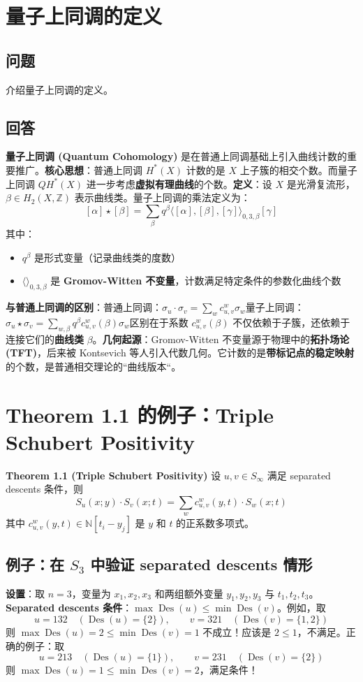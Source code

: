 \section{量子上同调的定义}\label{sec:QuantumCohomology}
\subsection{问题}
介绍量子上同调的定义。
\subsection{回答}
\textbf{量子上同调 (Quantum Cohomology)} 是在普通上同调基础上引入曲线计数的重要推广。\textbf{核心思想}：普通上同调 $H^*(X)$ 计数的是 $X$ 上子簇的相交个数。而量子上同调 $QH^*(X)$ 进一步考虑\textbf{虚拟有理曲线}的个数。\textbf{定义}：设 $X$ 是光滑复流形，$\beta \in H_2(X, \mathbb{Z})$ 表示曲线类。量子上同调的乘法定义为：$$[\alpha] \star [\beta] = \sum_{\beta} q^{\beta} \langle [\alpha], [\beta], [\gamma] \rangle_{0,3,\beta} [\gamma]$$其中：
\begin{itemize}
\item $q^{\beta}$ 是形式变量（记录曲线类的度数）
\item $\langle \rangle_{0,3,\beta}$ 是 \textbf{Gromov-Witten 不变量}，计数满足特定条件的参数化曲线个数
\end{itemize}

\textbf{与普通上同调的区别}：普通上同调：$\sigma_u \cdot \sigma_v = \sum_w c^w_{u,v} \sigma_w$量子上同调：$\sigma_u \star \sigma_v = \sum_{w,\beta} q^{\beta} c^w_{u,v}(\beta) \sigma_w$区别在于系数 $c^w_{u,v}(\beta)$ 不仅依赖于子簇，还依赖于连接它们的\textbf{曲线类} $\beta$。\textbf{几何起源}：Gromov-Witten 不变量源于物理中的\textbf{拓扑场论 (TFT)}，后来被 Kontsevich 等人引入代数几何。它计数的是\textbf{带标记点的稳定映射}的个数，是普通相交理论的``曲线版本``。
\section{Theorem 1.1 的例子：Triple Schubert Positivity}\label{app:Theorem11Examples}\textbf{Theorem 1.1 (Triple Schubert Positivity)} 设 $u, v \in S_\infty$ 满足 separated descents 条件，则$$S_u(x; y) \cdot S_v(x; t) = \sum_w c^w_{u,v}(y, t) \cdot S_w(x; t)$$其中 $c^w_{u,v}(y, t) \in \mathbb{N}[t_i - y_j]$ 是 $y$ 和 $t$ 的正系数多项式。
\subsection{例子：在 $S_3$ 中验证 separated descents 情形}\textbf{设置}：取 $n = 3$，变量为 $x_1, x_2, x_3$ 和两组额外变量 $y_1, y_2, y_3$ 与 $t_1, t_2, t_3$。\textbf{Separated descents 条件}：$\max \operatorname{Des}(u) \leq \min \operatorname{Des}(v)$。例如，取$$u = 132 \quad (\operatorname{Des}(u) = \{2\}), \qquad v = 321 \quad (\operatorname{Des}(v) = \{1, 2\})$$则 $\max \operatorname{Des}(u) = 2 \leq \min \operatorname{Des}(v) = 1$ 不成立！应该是 $2 \leq 1$，不满足。正确的例子：取$$u = 213 \quad (\operatorname{Des}(u) = \{1\}), \qquad v = 231 \quad (\operatorname{Des}(v) = \{2\})$$则 $\max \operatorname{Des}(u) = 1 \leq \min \operatorname{Des}(v) = 2$，满足条件！
